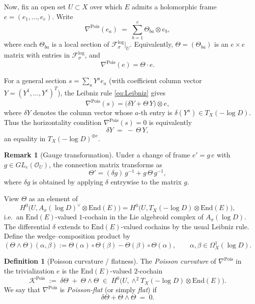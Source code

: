 \documentclass[11pt]{amsart}
\theoremstyle{plain}
\theoremstyle{definition}
\newtheorem{definition}[theorem]{Definition}
\newtheorem{remark}[theorem]{Remark}
\newcommand{\fol}{\mathcal{F}}
\theoremstyle{definition}
\newcommand{\OO}{\mathcal{O}}
\newcommand{\End}{\mathrm{End}}
\begin{document}
 

Now, fix an open set $U\subset X$ over which $E$ admits a holomorphic frame $e=(e_1,\dots,e_e)$.
Write
\begin{equation}\label{eq:Theta-loc}
\nabla^{\mathrm{Pois}}(e_a)
\;=\;
\sum_{b=1}^e \Theta_{ba}\otimes e_b,
\end{equation}
where each $\Theta_{ba}$ is a local section of $\fol_\sigma^{\log}|_U$.
Equivalently, $\Theta=(\Theta_{ba})$ is an $e\times e$ matrix with entries in $\fol_\sigma^{\log}$,
 and
$$
\nabla^{\mathrm{Pois}}(e)=\Theta\cdot e.
$$

For a general section $s=\sum_a Y^a e_a$ (with coefficient column vector $Y=(Y^1,\dots,Y^e)^T$),
the Leibniz rule \eqref{eq:Leibniz} gives
\begin{equation}\label{eq:connection-on-section}
\nabla^{\mathrm{Pois}}(s)
=
\big(\delta Y + \Theta\,Y\big)\otimes e,
\end{equation}
where $\delta Y$ denotes the column vector whose $a$-th entry is $\delta(Y^a)\in T_X(-\log D)$.
Thus the horizontality condition $\nabla^{\mathrm{Pois}}(s)=0$ is equivalently
\begin{equation}\label{eq:horizontal}
\delta Y \;=\; -\,\Theta\,Y,
\end{equation}
an equality in $T_X(-\log D)^{\oplus e}$.

\begin{remark}[Gauge transformation]\label{rem:gauge}
Under a change of frame $e'=g\,e$ with $g\in GL_e(\OO_U)$, the connection matrix transforms as
$$
\Theta'=(\delta g)\,g^{-1}+g\,\Theta\,g^{-1},
$$
where $\delta g$ is obtained by applying $\delta$ entrywise to the matrix $g$.
\end{remark}
View $\Theta$ as an element of
$$
 H^0\big(U, A_\sigma(\log D)^\vee\otimes \End(E)\big)
=
 H^0\big(U, T_X(-\log D)\otimes \End(E)\big),
$$
i.e.\ an $\End(E)$-valued $1$-cochain in the Lie algebroid complex of $A_\sigma(\log D)$.
The differential $\delta$ extends to $\End(E)$-valued cochains by the usual Leibniz rule.
Define the wedge--composition product by
$$
(\Theta\wedge\Theta)(\alpha,\beta)
:=\Theta(\alpha)\circ\Theta(\beta)-\Theta(\beta)\circ\Theta(\alpha),
\qquad
\alpha,\beta\in\Omega_X^1(\log D).
$$

\begin{definition}[Poisson curvature / flatness]\label{def:flatness}
The \emph{Poisson curvature} of $\nabla^{\mathrm{Pois}}$ in the trivialization $e$ is the $\End(E)$-valued $2$-cochain
\begin{equation}\label{eq:curvature}
\mathcal{K}^{\mathrm{Pois}}
\;:=\;
\delta\Theta \;+\; \Theta \wedge \Theta
\;\in\;
 H^0\big(U,\wedge^2 T_X(-\log D)\otimes \End(E)\big).
\end{equation}
We say that $\nabla^{\mathrm{Pois}}$ is \emph{Poisson-flat} (or simply \emph{flat}) if
\begin{equation}\label{eq:flat}
\delta\Theta + \Theta\wedge\Theta \;=\; 0.
\end{equation}
\end{definition}
\end{document}
